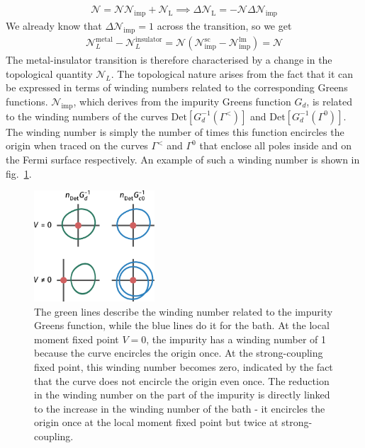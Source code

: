 \documentclass[reprint,hidelinks]{revtex4-2}
\begin{document}
\begin{widetext}
\begin{equation}
\begin{aligned}
	\mathcal{N} = \mathcal{N} \mathcal{N}_\text{imp} + \mathcal{N}_\text{L} \implies \Delta \mathcal{N}_\text{L} = - \mathcal{N} \Delta \mathcal{N}_\text{imp}
\end{aligned}\end{equation}
We already know that \(\Delta \mathcal{N}_\text{imp}=1\) across the transition, so we get
\begin{equation}\begin{aligned}
	\mathcal{N}_L^\text{metal} - \mathcal{N}_L^\text{insulator} = \mathcal{N}\left(\mathcal{N}_\text{imp}^\text{sc} - \mathcal{N}_\text{imp}^\text{lm}\right) = \mathcal{N}
\end{aligned}\end{equation}
The metal-insulator transition is therefore characterised by a change in the topological quantity \(\mathcal{N}_L\). The topological nature arises from the fact that it can be expressed in terms of winding numbers related to the corresponding Greens functions. \(\mathcal{N}_\text{imp}\), which derives from the impurity Greens function \(G_d\), is related to the winding numbers of the curves \(\text{Det}[G_d^{-1}(\Gamma^<)]\) and \(\text{Det}[G_d^{-1}(\Gamma^0)]\). The winding number is simply the number of times this function encircles the origin when traced on the curves \(\Gamma^<\) and \(\Gamma^0\) that enclose all poles inside and on the Fermi surface respectively. An example of such a winding number is shown in fig.~\ref{imp_winding}.
\begin{figure}[!htb]
	\centering
	\includegraphics[width=0.4\textwidth]{windingNumbers.pdf}
	\caption{The green lines describe the winding number related to the impurity Greens function, while the blue lines do it for the bath. At the local moment fixed point \(V=0\), the impurity has a winding number of 1 because the curve encircles the origin once. At the strong-coupling fixed point, this winding number becomes zero, indicated by the fact that the curve does not encircle the origin even once. The reduction in the winding number on the part of the impurity is directly linked to the increase in the winding number of the bath - it encircles the origin once at the local moment fixed point but twice at strong-coupling.}
	\label{imp_winding}
\end{figure}



\end{widetext}
\end{document}
